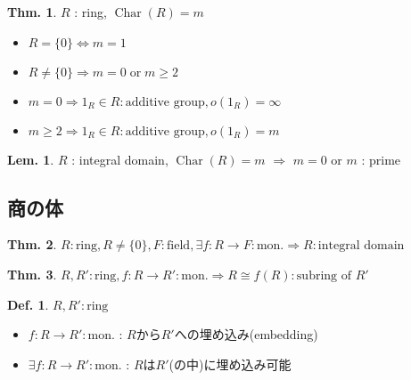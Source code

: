 \documentclass[uplatex,dvipdfmx,9pt]{beamer}
\newcommand{\Char}[1]{\operatorname{Char}(#1)}
\newcommand{\mon}{\text{mon.}} %
\newcommand{\sscount}{\textsection \thesubsection}
\newcounter{textLemCount}
\newcounter{textExmCount}
\theoremstyle{definition} %
\newtheorem{defn}{Def.}[subsection] %
\newtheorem{thm}{Thm.}[subsection] %
\newtheorem{lemText}[textLemCount]{Lem.} %
\theoremstyle{example}
\begin{document}
    \begin{frame}

     \begin{thm}
      $R$ : ring, $\Char{R} = m$
      \begin{itemize}
        \item $R = \{0\} \Leftrightarrow m = 1$
        \item $R \neq \{0\} \Rightarrow m = 0 \; \text{or} \; m \ge 2$
        \item $m = 0 \Rightarrow 1_R \in R : \text{additive group}, o(1_R) = \infty$
        \item $m \ge 2 \Rightarrow 1_R \in R : \text{additive group}, o(1_R) = m$
      \end{itemize}
    \end{thm} 

    \begin{lemText}
      $R$ : integral domain, $\Char{R} = m$ $\Rightarrow$ $m = 0$ or $m$ : prime
    \end{lemText}

    \end{frame}

    \subsection{\sscount 商の体}
    \setcounter{textExmCount}{0}

    \begin{frame}

      \begin{thm}
        $R : \text{ring}, R \neq \{0\}, F : \text{field}, \exists f\colon R \to F : \mon \Rightarrow R : \text{integral domain}$
      \end{thm}

      \begin{thm}
        $R, R' : \text{ring}, f\colon R \to R' : \mon \Rightarrow R \cong f(R) : \text{subring of $R'$}$
      \end{thm}

      \begin{defn}
        $R, R' : \text{ring}$
        \begin{itemize}
          \item $f\colon R \to R' : \mon$ : $R$から$R'$への\alert{埋め込み(embedding)}
          \item $\exists f\colon R \to R' : \mon$ : $R$は$R'$(の中)に\alert{埋め込み可能}
        \end{itemize}
      \end{defn}
      
    \end{frame}
\end{document}
